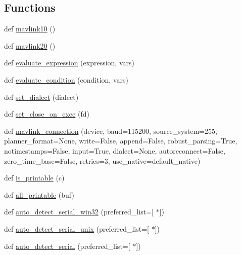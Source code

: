 \subsection*{Functions}
\begin{DoxyCompactItemize}
\item 
def \hyperlink{namespacepymavlink_1_1mavutil_a7fd32207af170dbaf42dbd56905e6f38}{mavlink10} ()
\item 
def \hyperlink{namespacepymavlink_1_1mavutil_add838268f6c1da5cbdf2690e6f89c00d}{mavlink20} ()
\item 
def \hyperlink{namespacepymavlink_1_1mavutil_a59db6edd846450994bc53aabfeafff08}{evaluate\+\_\+expression} (expression, vars)
\item 
def \hyperlink{namespacepymavlink_1_1mavutil_a850b6d86829b1c79a5d58a74e8e2c3a0}{evaluate\+\_\+condition} (condition, vars)
\item 
def \hyperlink{namespacepymavlink_1_1mavutil_a00783411dfe2e390ef6fe4427a7a1b76}{set\+\_\+dialect} (dialect)
\item 
def \hyperlink{namespacepymavlink_1_1mavutil_ac57a06b1fcc6d1aebdf19e127291fedd}{set\+\_\+close\+\_\+on\+\_\+exec} (fd)
\item 
def \hyperlink{namespacepymavlink_1_1mavutil_a021b0a1b1d488c0800662acaef819852}{mavlink\+\_\+connection} (device, baud=115200, source\+\_\+system=255, planner\+\_\+format=None, write=False, append=False, robust\+\_\+parsing=True, notimestamps=False, input=True, dialect=None, autoreconnect=False, zero\+\_\+time\+\_\+base=False, retries=3, use\+\_\+native=default\+\_\+native)
\item 
def \hyperlink{namespacepymavlink_1_1mavutil_ae8d15d242baf89755d968c50f6f300b1}{is\+\_\+printable} (c)
\item 
def \hyperlink{namespacepymavlink_1_1mavutil_ad8151d7419cca7f25a52185b8844c09e}{all\+\_\+printable} (buf)
\item 
def \hyperlink{namespacepymavlink_1_1mavutil_a7fcffc8f8165b00fa7fb9c81886e66d9}{auto\+\_\+detect\+\_\+serial\+\_\+win32} (preferred\+\_\+list=\mbox{[}\textquotesingle{} $\ast$\textquotesingle{}\mbox{]})
\item 
def \hyperlink{namespacepymavlink_1_1mavutil_a25cdb766d4635c7ca2e491614b6d87c7}{auto\+\_\+detect\+\_\+serial\+\_\+unix} (preferred\+\_\+list=\mbox{[}\textquotesingle{} $\ast$\textquotesingle{}\mbox{]})
\item 
def \hyperlink{namespacepymavlink_1_1mavutil_a256e344d1870c0a938cac5b21d3003be}{auto\+\_\+detect\+\_\+serial} (preferred\+\_\+list=\mbox{[}\textquotesingle{} $\ast$\textquotesingle{}\mbox{]})

\end{DoxyCompactItemize}
